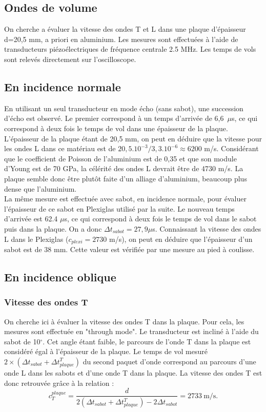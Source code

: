 \documentclass[twoside]{article}
\begin{document}
\begin{multicols}{2}
\section{Ondes de volume}

On cherche a évaluer la vitesse des ondes T et L dans une plaque d'épaisseur d=20,5 mm, a priori en aluminium. Les mesures sont effectuées à l'aide de  transducteurs piézoélectriques de fréquence centrale 2.5 MHz. Les temps de vols sont relevés directement sur l'oscilloscope. 

\subsection{En incidence normale}

En utilisant un seul transducteur en mode écho (sans sabot), une succession d'écho est observé. Le premier correspond à un temps d'arrivée de 6,6~$\mu$s, ce qui correspond à deux fois le temps de vol dans une épaisseur de la plaque. L'épaisseur de la plaque étant de 20,5 mm, on peut en déduire que la vitesse pour les ondes L dans ce matériau est de $20,5.10^{-3}/3,3.10^{-6}\approx6200$ m/s. Considérant que le coefficient de Poisson de l'aluminium est de 0,35 et que son module d'Young est de 70 GPa, la célérité des ondes L devrait être de 4730 m/s. La plaque semble donc être plutôt faite d'un alliage d'aluminium, beaucoup plus dense que l'aluminium.\\

La même mesure est effectuée avec sabot, en incidence normale, pour évaluer l'épaisseur de ce sabot en Plexiglas utilisé par la suite. Le nouveau temps d'arrivée est 62.4 $\mu$s, ce qui correspond à deux fois le temps de vol dans le sabot puis dans la plaque. On a donc $\Delta t_{sabot} =27,9 \mu$s. Connaissant la vitesse des ondes L dans le Plexiglas ($c_{plexi}=2730$ m/s), on peut en déduire que l'épaisseur d'un sabot est de 38 mm. Cette valeur est vérifiée par une mesure au pied à coulisse.

\subsection{En incidence oblique}
	\subsubsection{Vitesse des ondes T}
	On cherche ici à évaluer la vitesse des ondes T dans la plaque. Pour cela, les mesures sont effectuée en "through mode".
	Le transducteur est incliné à l'aide du sabot de 10$^{\circ}$. Cet angle étant faible, le parcours de l'onde T dans la plaque est considéré égal à l'épaisseur de la plaque. Le temps de vol mesuré $2\times(\Delta t_{sabot}+\Delta t_{plaque}^T)$ du second paquet d'onde correspond au parcours d'une onde L dans les sabots et d'une onde T dans la plaque. La vitesse des ondes T est donc retrouvée grâce à la relation : 
	$$c_{T}^{plaque}=\frac{d}{2(\Delta t_{sabot}+\Delta t_{plaque}^T)-2\Delta t_{sabot}}=2733~ \text{m/s.}$$
	

\end{multicols}
\end{document}
